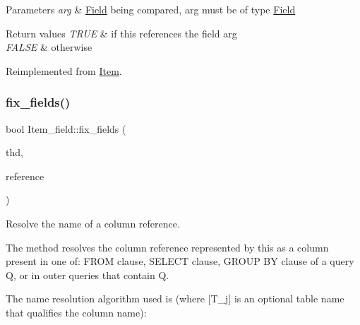 \begin{DoxyParams}{Parameters}
{\em arg} & \mbox{\hyperlink{classField}{Field}} being compared, arg must be of type \mbox{\hyperlink{classField}{Field}}\\
\hline
\end{DoxyParams}

\begin{DoxyRetVals}{Return values}
{\em T\+R\+UE} & if \textquotesingle{}this\textquotesingle{} references the field \textquotesingle{}arg\textquotesingle{} \\
\hline
{\em F\+A\+L\+SE} & otherwise \\
\hline
\end{DoxyRetVals}


Reimplemented from \mbox{\hyperlink{classItem}{Item}}.

\mbox{\label{classItem__field_af2e31f1efd8af31c01f0e6dc8f41aea6}} 
\subsubsection{\texorpdfstring{fix\+\_\+fields()}{fix\_fields()}}
{\footnotesize\ttfamily bool Item\+\_\+field\+::fix\+\_\+fields (\begin{DoxyParamCaption}\item[{T\+HD $\ast$}]{thd,  }\item[{\mbox{\hyperlink{classItem}{Item}} $\ast$$\ast$}]{reference }\end{DoxyParamCaption})\hspace{0.3cm}{\ttfamily [virtual]}}

Resolve the name of a column reference.

The method resolves the column reference represented by \textquotesingle{}this\textquotesingle{} as a column present in one of\+: F\+R\+OM clause, S\+E\+L\+E\+CT clause, G\+R\+O\+UP BY clause of a query Q, or in outer queries that contain Q.

The name resolution algorithm used is (where \mbox{[}T\+\_\+j\mbox{]} is an optional table name that qualifies the column name)\+:


